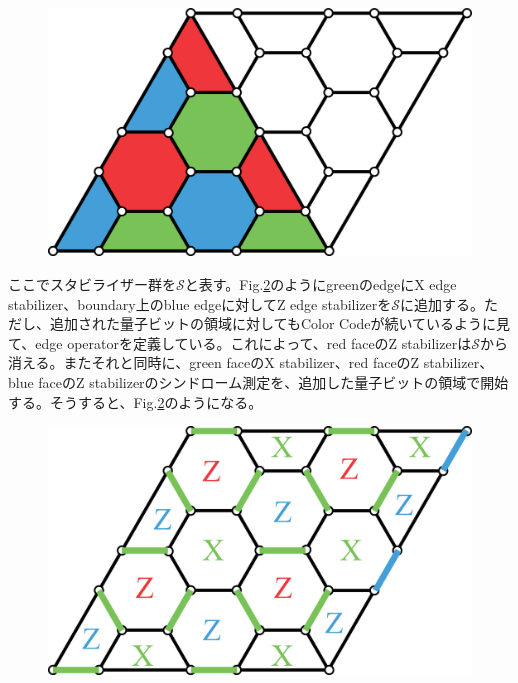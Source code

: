 \documentclass[a4paper,9pt]{ltjsarticle}
\begin{document}
{    \begin{figure}[h]
        \centering
        \includegraphics[scale=0.15]{figure/figure2.eps}
        \vspace{10pt}\caption{}
        \label{figure2}
        \vspace{-15pt}
    \end{figure}

    ここでスタビライザー群を$\mathcal{S}$と表す。Fig.\ref{figure3}のようにgreenのedgeにX edge stabilizer、boundary上のblue edgeに対してZ edge stabilizerを$\mathcal{S}$に追加する。ただし、追加された量子ビットの領域に対してもColor Codeが続いているように見て、edge operatorを定義している。これによって、red faceのZ stabilizerは$\mathcal{S}$から消える。またそれと同時に、green faceのX stabilizer、red faceのZ stabilizer、blue faceのZ stabilizerのシンドローム測定を、追加した量子ビットの領域で開始する。そうすると、Fig.\ref{figure3}のようになる。
    \clearpage

    \begin{figure}[h]
        \centering
        \includegraphics[scale=0.15]{figure/figure3.eps}
        \vspace{10pt}\caption{}
        \label{figure3}
        \vspace{-15pt}
    \end{figure}

}
\end{document}
